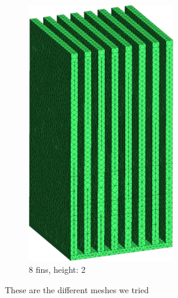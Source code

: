 \begin{figure}[h t!]
\begin{subfigure}[t] {0.23\textwidth}
 \includegraphics[width=0.7\textwidth]{"../figures/mesh_8_2 (new)"}
 \caption{8 fins, height: 2}
 \label{fig:mesh_8_2}
 \end{subfigure}
 \caption{These are the different meshes we tried}
 \label{fig:meshes}
 \end{figure}


